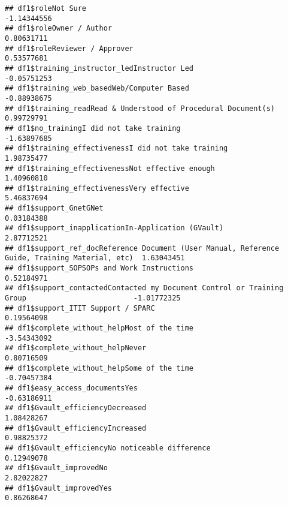 \documentclass[
]{article}
\begin{document}
\begin{verbatim}
## df1$roleNot Sure                                                                             -1.14344556
## df1$roleOwner / Author                                                                        0.80631711
## df1$roleReviewer / Approver                                                                   0.53577681
## df1$training_instructor_ledInstructor Led                                                    -0.05751253
## df1$training_web_basedWeb/Computer Based                                                     -0.88938675
## df1$training_readRead & Understood of Procedural Document(s)                                  0.99729791
## df1$no_trainingI did not take training                                                       -1.63897685
## df1$training_effectivenessI did not take training                                             1.98735477
## df1$training_effectivenessNot effective enough                                                1.40960810
## df1$training_effectivenessVery effective                                                      5.46837694
## df1$support_GnetGNet                                                                          0.03184388
## df1$support_inapplicationIn-Application (GVault)                                              2.87712521
## df1$support_ref_docReference Document (User Manual, Reference Guide, Training Material, etc)  1.63043451
## df1$support_SOPSOPs and Work Instructions                                                     0.52184971
## df1$support_contactedContacted my Document Control or Training Group                         -1.01772325
## df1$support_ITIT Support / SPARC                                                              0.19564098
## df1$complete_without_helpMost of the time                                                    -3.54343092
## df1$complete_without_helpNever                                                                0.80716509
## df1$complete_without_helpSome of the time                                                    -0.70457384
## df1$easy_access_documentsYes                                                                 -0.63186911
## df1$Gvault_efficiencyDecreased                                                                1.08428267
## df1$Gvault_efficiencyIncreased                                                                0.98825372
## df1$Gvault_efficiencyNo noticeable difference                                                 0.12949078
## df1$Gvault_improvedNo                                                                         2.82022827
## df1$Gvault_improvedYes                                                                        0.86268647

\end{verbatim}
\end{document}
